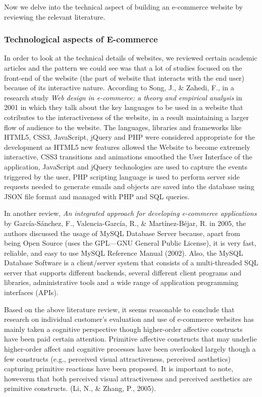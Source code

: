Now we delve into the technical aspect of building an e-commerce website by reviewing the relevant literature.

\subsubsection {Technological aspects of E-commerce}

In order to look at the technical details of websites, we reviewed certain academic articles and the pattern we could see was that a lot of studies focused on the front-end of the website (the part of website that interacts with the end user) because of its interactive nature. According to Song, J., \& Zahedi, F., in a research study \textit {Web design in e-commerce: a theory and empirical analysis} in 2001 in which they talk about the key languages to be used in a website that cotributes to the interactiveness of the website, in a result maintaining a larger flow of audience to the website. The languages, libraries and frameworks like HTML5, CSS3, JavaScript, jQuery and PHP were considered appropriate for the development as HTML5 new features allowed the Website to become extremely interactive, CSS3 transitions and animations smoothed the User Interface of the application, JavaScript and jQuery technologies are used to capture the events triggered by the user, PHP scripting language is used to perform server side requests needed to generate emails and objects are saved into the database using JSON file format and managed with PHP and SQL queries.

In another review, \textit {An integrated approach for developing e-commerce applications} by García-Sánchez, F., Valencia-García, R., \& Martínez-Béjar, R. in 2005, the authors discussed the usage of MySQL Database Server because, apart from being Open Source (uses the GPL—GNU General Public License), it is very fast, reliable, and easy to use MySQL Reference Manual (2002). Also, the MySQL Database Software is a client/server system that consists of a multi-threaded SQL server that supports different backends, several different client programs and libraries, administrative tools and a wide range of application programming interfaces (APIs).

Based on the above literature review, it seems reasonable to conclude that research on individual customer’s evaluation and use of e-commerce websites has mainly taken a cognitive perspective though higher-order affective constructs have been paid certain attention. Primitive affective constructs that may underlie higher-order affect and cognitive processes have been overlooked largely though a few constructs (e.g., perceived visual attractiveness, perceived aesthetics) capturing primitive reactions have been proposed. It is important to note, howeverm that both perceived visual attractiveness and perceived aesthetics are primitive constructs.  (Li, N., \& Zhang, P., 2005).

